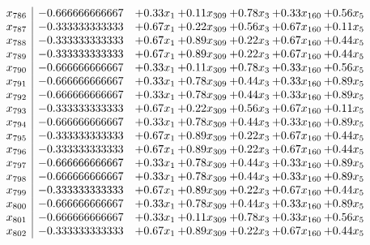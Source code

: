 \documentclass[8pt]{article}
\begin{document}
\[\begin{array}{c| c c@{\hskip 2pt} c@{\hskip 2pt} c@{\hskip 2pt} c@{\hskip 2pt} c@{\hskip 2pt} }
 x_{786}   &  -0.666666666667 & +  0.33 x_{1} & +  0.11 x_{309} & +  0.78 x_{3} & +  0.33 x_{160} & +  0.56 x_{5}\\
 x_{787}   &  -0.333333333333 & +  0.67 x_{1} & +  0.22 x_{309} & +  0.56 x_{3} & +  0.67 x_{160} & +  0.11 x_{5}\\
 x_{788}   &  -0.333333333333 & +  0.67 x_{1} & +  0.89 x_{309} & +  0.22 x_{3} & +  0.67 x_{160} & +  0.44 x_{5}\\
 x_{789}   &  -0.333333333333 & +  0.67 x_{1} & +  0.89 x_{309} & +  0.22 x_{3} & +  0.67 x_{160} & +  0.44 x_{5}\\
 x_{790}   &  -0.666666666667 & +  0.33 x_{1} & +  0.11 x_{309} & +  0.78 x_{3} & +  0.33 x_{160} & +  0.56 x_{5}\\
 x_{791}   &  -0.666666666667 & +  0.33 x_{1} & +  0.78 x_{309} & +  0.44 x_{3} & +  0.33 x_{160} & +  0.89 x_{5}\\
 x_{792}   &  -0.666666666667 & +  0.33 x_{1} & +  0.78 x_{309} & +  0.44 x_{3} & +  0.33 x_{160} & +  0.89 x_{5}\\
 x_{793}   &  -0.333333333333 & +  0.67 x_{1} & +  0.22 x_{309} & +  0.56 x_{3} & +  0.67 x_{160} & +  0.11 x_{5}\\
 x_{794}   &  -0.666666666667 & +  0.33 x_{1} & +  0.78 x_{309} & +  0.44 x_{3} & +  0.33 x_{160} & +  0.89 x_{5}\\
 x_{795}   &  -0.333333333333 & +  0.67 x_{1} & +  0.89 x_{309} & +  0.22 x_{3} & +  0.67 x_{160} & +  0.44 x_{5}\\
 x_{796}   &  -0.333333333333 & +  0.67 x_{1} & +  0.89 x_{309} & +  0.22 x_{3} & +  0.67 x_{160} & +  0.44 x_{5}\\
 x_{797}   &  -0.666666666667 & +  0.33 x_{1} & +  0.78 x_{309} & +  0.44 x_{3} & +  0.33 x_{160} & +  0.89 x_{5}\\
 x_{798}   &  -0.666666666667 & +  0.33 x_{1} & +  0.78 x_{309} & +  0.44 x_{3} & +  0.33 x_{160} & +  0.89 x_{5}\\
 x_{799}   &  -0.333333333333 & +  0.67 x_{1} & +  0.89 x_{309} & +  0.22 x_{3} & +  0.67 x_{160} & +  0.44 x_{5}\\
 x_{800}   &  -0.666666666667 & +  0.33 x_{1} & +  0.78 x_{309} & +  0.44 x_{3} & +  0.33 x_{160} & +  0.89 x_{5}\\
 x_{801}   &  -0.666666666667 & +  0.33 x_{1} & +  0.11 x_{309} & +  0.78 x_{3} & +  0.33 x_{160} & +  0.56 x_{5}\\
 x_{802}   &  -0.333333333333 & +  0.67 x_{1} & +  0.89 x_{309} & +  0.22 x_{3} & +  0.67 x_{160} & +  0.44 x_{5}\\

\end{array}\]
\end{document}
